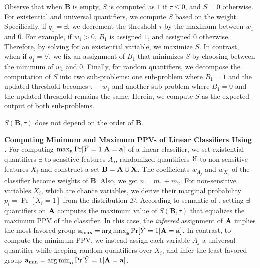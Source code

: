Observe that when $ \textbf{B} $ is empty, $S$ is computed as $ 1 $ if $ \tau \le 0 $, and  $ S = 0 $ otherwise. For  existential and universal quantifiers, we compute $ S $ based on the weight. Specifically, if $ q_1 = \exists $, we decrement the threshold $ \tau $ by the maximum between $ w_1 $ and $ 0 $. For example, if $ w_1 > 0 $, $ B_1 $ is assigned $ 1 $, and assigned $ 0 $ otherwise. Therefore, by solving for an existential variable, we  maximize $ S $. In contrast, when if $ q_1 = \forall $, we fix an assignment of $ B_1 $ that minimizes $ S $ by choosing between the minimum of $ w_1 $ and $ 0 $. Finally, for random quantifiers, we decompose the computation of $S$ into two sub-problems: one sub-problem where $ B_1 = 1 $ and the updated threshold becomes $ \tau - w_1 $ and another sub-problem where $ B_1 = 0 $ and the updated threshold remains the same. Herein, we compute $ S $ as the expected output of both sub-problems.

\begin{remark}
	\label{fvgm_lm:property_s3p}
	$ S(\mathbf{B},\tau) $ does not depend on the order of $ \mathbf{B} $.
\end{remark}

\textbf{Computing Minimum and Maximum PPVs of Linear Classifiers Using  {\stochastic}.} For computing $ \max_{ \mathbf{a}} \Pr[\hat{Y} =1 | \mathbf{A} = \mathbf{a}] $ of a linear classifier, we set existential quantifiers $ \exists $ to sensitive features $ A_j $, randomized quantifiers $ \R $ to non-sensitive features $ X_i $ and construct a set $ \mathbf{B} = \mathbf{A} \cup \mathbf{X} $.  The coefficients $ w_{A_j} $ and $ w_{X_i} $ of the classifier become weights of $ \mathbf{B} $. Also, we get $n=m_1 +m_2$. For non-sensitive variables $ X_i $, which are chance variables, we derive their marginal probability $ p_i = \Pr[X_i = 1] $ from the distribution $ \mathcal{D} $.  According to semantic of {\stochastic}, setting $ \exists $ quantifiers on $ \mathbf{A} $ computes the maximum value of $ S(\mathbf{B}, \tau) $ that equalizes the maximum PPV of the classifier. In this case, the \textit{inferred} assignment of $ \mathbf{A} $ implies the most favored group $ \mathbf{a}_{{\max}} =  \operatorname*{arg\,max}_{ \mathbf{a}} \Pr[\hat{Y} =1 | \mathbf{A} = \mathbf{a}] $. In contrast, to compute the minimum PPV, we instead assign each variable  $ A_j $ a universal  quantifier  while keeping random quantifiers over $ X_i $, and infer the least favored group $ \mathbf{a}_{{\min}} =  \operatorname*{arg\,min}_{ \mathbf{a}} \Pr[\hat{Y} =1 | \mathbf{A} = \mathbf{a}] $.

